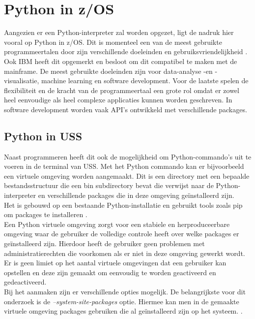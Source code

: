 \section{Python in z/OS}
Aangezien er een Python-interpreter zal worden opgezet, ligt de nadruk hier vooral op Python in z/OS. Dit is momenteel een van de meest gebruikte programmeertalen door zijn verschillende doeleinden en gebruiksvriendelijkheid \autocite{Johnson2023}. Ook IBM heeft dit opgemerkt en besloot om dit compatibel te maken met de mainframe. De meest gebruikte doeleinden zijn voor data-analyse -en -visualisatie, machine learning en software development. Voor de laatste spelen de flexibiliteit en de kracht van de programmeertaal een grote rol omdat er zowel heel eenvoudige als heel complexe applicaties kunnen worden geschreven. In software development worden vaak API's ontwikkeld met verschillende packages. \autocite{Kosourova2022} \\

\subsection{Python in USS}
Naast programmeren heeft dit ook de mogelijkheid om Python-commando's uit te voeren in de terminal van USS. Met het Python commando kan er bijvoorbeeld een virtuele omgeving worden aangemaakt. Dit is een directory met een bepaalde bestandsstructuur die een bin subdirectory bevat die verwijst naar de Python-interpreter en verschillende packages die in deze omgeving geïnstalleerd zijn.  \autocite{UniPrinceton2022} \\
Het is gebouwd op een bestaande Python-installatie en gebruikt tools zoals pip om packages te installeren \autocite{PSF2024}. \\

Een Python virtuele omgeving zorgt voor een stabiele en herproduceerbare omgeving waar de gebruiker de volledige controle heeft over welke packages er geïnstalleerd zijn. Hierdoor heeft de gebruiker geen problemen met administratierechten die voorkomen als er niet in deze omgeving gewerkt wordt. Er is geen limiet op het aantal virtuele omgevingen dat een gebruiker kan opstellen en deze zijn gemaakt om eenvoudig te worden geactiveerd en gedeactiveerd. \autocite{UniPrinceton2022} \\

Bij het aanmaken zijn er verschillende opties mogelijk. De belangrijkste voor dit onderzoek is de \textit{--system-site-packages} optie. Hiermee kan men in de gemaakte virtuele omgeving packages gebruiken die al geïnstalleerd zijn op het systeem. \autocite{PSF2024}.

